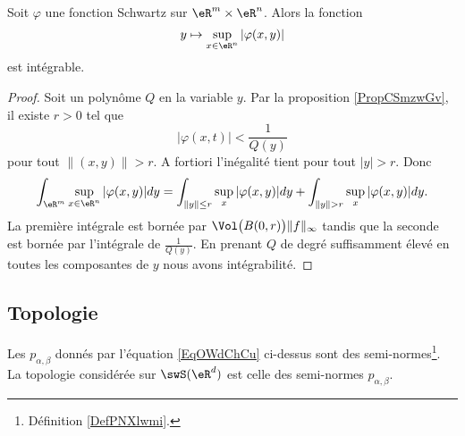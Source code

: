 \begin{corollary}        \label{CORooZFPSooHCFUSH}
    Soit \( \varphi\) une fonction Schwartz sur \( \eR^m\times \eR^n\). Alors la fonction
    \begin{equation}
        y\mapsto \sup_{x\in \eR^n}| \varphi(x,y) |
    \end{equation}
    est intégrable.
\end{corollary}

\begin{proof}
    Soit un polynôme \( Q\) en la variable \( y\). Par la proposition \ref{PropCSmzwGv}, il existe \( r>0\) tel que
    \begin{equation}
        | \varphi(x,t) |<\frac{1}{ Q(y) }
    \end{equation}
    pour tout \( \| (x,y) \|>r\). A fortiori l'inégalité tient pour tout \( | y |>r\). Donc
    \begin{equation}
        \int_{\eR^m}\sup_{x\in \eR^n}| \varphi(x,y) |dy=\int_{\| y \|\leq r}\sup_{x}| \varphi(x,y) |dy+\int_{ \| y \|>r  }\sup_{x}| \varphi(x,y) |dy.
    \end{equation}
    La première intégrale est bornée par \( \Vol\big( B(0,r) \big)\| f \|_{\infty}\) tandis que la seconde est bornée par l'intégrale de \( \frac{1}{ Q(y) }\). En prenant \( Q\) de degré suffisamment élevé en toutes les composantes de \( y\) nous avons intégrabilité.
\end{proof}

\subsection{Topologie}

\begin{lemmaDef}        \label{LEMDEFooZEFVooMMmiBr}
    Les \( p_{\alpha,\beta}\) donnés par l'équation \eqref{EqOWdChCu} ci-dessus sont des semi-normes\footnote{Définition \ref{DefPNXlwmi}.}. La topologie considérée sur \( \swS(\eR^d)\) est celle des semi-normes \( p_{\alpha,\beta}\).
\end{lemmaDef}

